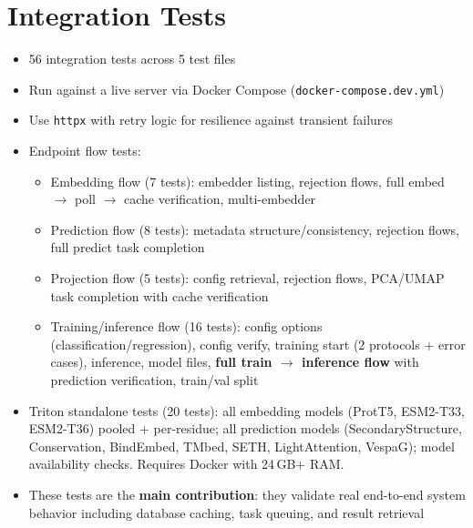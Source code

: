 \section{Integration Tests}\label{sec:integration-tests}
\begin{itemize}
  \item 56 integration tests across 5 test files
  \item Run against a live server via Docker Compose (\texttt{docker-compose.dev.yml})
  \item Use \texttt{httpx} with retry logic for resilience against transient failures
  \item Endpoint flow tests:
    \begin{itemize}
      \item Embedding flow (7 tests): embedder listing, rejection flows, full embed $\to$ poll $\to$ cache verification, multi-embedder
      \item Prediction flow (8 tests): metadata structure/consistency, rejection flows, full predict task completion
      \item Projection flow (5 tests): config retrieval, rejection flows, PCA/UMAP task completion with cache verification
      \item Training/inference flow (16 tests): config options (classification/regression), config verify, training start (2 protocols + error cases), inference, model files, \textbf{full train $\to$ inference flow} with prediction verification, train/val split
    \end{itemize}
  \item Triton standalone tests (20 tests): all embedding models (ProtT5, ESM2-T33, ESM2-T36) pooled + per-residue; all prediction models (SecondaryStructure, Conservation, BindEmbed, TMbed, SETH, LightAttention, VespaG); model availability checks. Requires Docker with 24\,GB+ RAM.
  \item These tests are the \textbf{main contribution}: they validate real end-to-end system behavior including database caching, task queuing, and result retrieval
\end{itemize}

